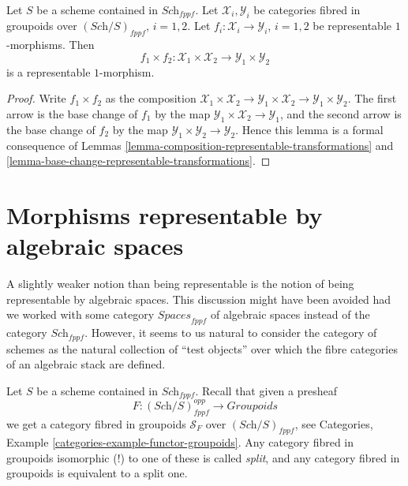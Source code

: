 \begin{lemma}
\label{lemma-product-representable-transformations}
Let $S$ be a scheme contained in $\textit{Sch}_{fppf}$.
Let $\mathcal{X}_i, \mathcal{Y}_i$ be categories fibred in groupoids over
$(\textit{Sch}/S)_{fppf}$, $i = 1, 2$.
Let $f_i : \mathcal{X}_i \to \mathcal{Y}_i$, $i = 1, 2$
be representable $1$-morphisms.
Then
$$
f_1 \times f_2 :
\mathcal{X}_1 \times \mathcal{X}_2
\longrightarrow
\mathcal{Y}_1 \times \mathcal{Y}_2
$$
is a representable $1$-morphism.
\end{lemma}

\begin{proof}
Write $f_1 \times f_2$ as the composition
$\mathcal{X}_1 \times \mathcal{X}_2 \to
\mathcal{Y}_1 \times \mathcal{X}_2 \to
\mathcal{Y}_1 \times \mathcal{Y}_2$.
The first arrow is the base change of $f_1$ by the map
$\mathcal{Y}_1 \times \mathcal{X}_2 \to \mathcal{Y}_1$, and the second arrow
is the base change of $f_2$ by the map
$\mathcal{Y}_1 \times \mathcal{Y}_2 \to \mathcal{Y}_2$.
Hence this lemma is a formal
consequence of Lemmas \ref{lemma-composition-representable-transformations}
and \ref{lemma-base-change-representable-transformations}.
\end{proof}






\section{Morphisms representable by algebraic spaces}
\label{section-representable-by-algebraic-spaces}

\noindent
A slightly weaker notion than being representable is the notion of
being representable by algebraic spaces. This discussion might have
been avoided had we worked with some category $\textit{Spaces}_{fppf}$
of algebraic spaces instead of the category $\textit{Sch}_{fppf}$.
However, it seems to us natural to consider the category of schemes
as the natural collection of ``test objects'' over which the fibre
categories of an algebraic stack are defined.

\medskip\noindent
Let $S$ be a scheme contained in $\textit{Sch}_{fppf}$.
Recall that given a presheaf
$$
F : (\textit{Sch}/S)_{fppf}^{opp} \longrightarrow \textit{Groupoids}
$$
we get a category fibred in groupoids $\mathcal{S}_F$ over
$(\textit{Sch}/S)_{fppf}$, see
Categories, Example \ref{categories-example-functor-groupoids}.
Any category fibred in groupoids isomorphic (!) to one of these
is called {\it split}, and any category fibred in groupoids
is equivalent to a split one.

